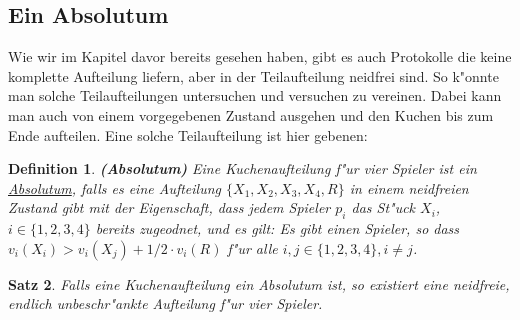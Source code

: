 \documentclass[11pt, a4paper, twoside]{article}
\newtheorem{satz}{Satz}
\newtheorem{defi}[satz]{Definition}
\numberwithin{equation}{section}
\begin{document}
\subsection{Ein Absolutum}
Wie wir im Kapitel davor bereits gesehen haben, gibt es auch Protokolle die keine komplette Aufteilung liefern, aber in der Teilaufteilung neidfrei sind. So k"onnte man solche Teilaufteilungen untersuchen und versuchen zu vereinen. Dabei kann man auch von einem vorgegebenen Zustand ausgehen und den Kuchen bis zum Ende aufteilen. Eine solche Teilaufteilung ist hier gebenen:
\begin{defi}{\textbf{(Absolutum)}}
\newline Eine Kuchenaufteilung f"ur vier Spieler ist ein \underline{Absolutum}, falls es eine Aufteilung $\{X_1,X_2,X_3,X_4,R\}$ in einem neidfreien Zustand gibt mit der Eigenschaft, dass jedem Spieler $p_i$  das St"uck $X_i$, $i\in \{1,2,3,4\}$ bereits zugeodnet, und es gilt: Es gibt einen Spieler, so dass $v_i(X_i)>v_i(X_j)+1/2\cdot v_i(R)$ f"ur alle $i,j \in \{1,2,3,4\}, i \neq j$. 
\end{defi}
\begin{satz}
Falls eine Kuchenaufteilung ein Absolutum ist, so existiert eine neidfreie, endlich unbeschr"ankte Aufteilung f"ur vier Spieler.
\end{satz}
\end{document}
